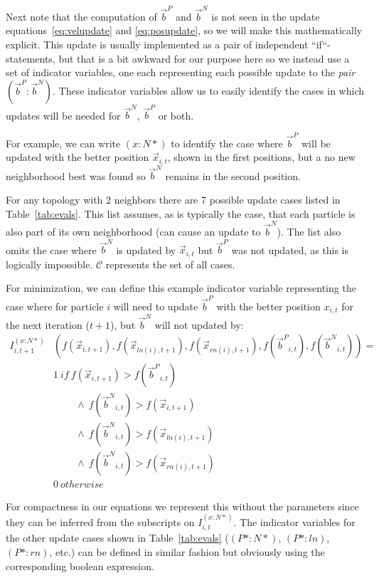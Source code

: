 \documentclass[journal,letterpaper]{IEEEtran}
\providecommand{\pers}{\ensuremath{P}}
\providecommand{\neigh}{\ensuremath{N}}
\providecommand{\ppos}{\ensuremath{\Vec{x}}}
\providecommand{\nbest}{\ensuremath{\Vec{b}^\neigh}}
\providecommand{\pbest}{\ensuremath{\Vec{b}^\pers}}
\providecommand{\ofunc}{\ensuremath{f}}
\providecommand{\indic}{\ensuremath{I}}
\providecommand{\ln}{\ensuremath{ln}}
\providecommand{\rn}{\ensuremath{rn}}
\providecommand{\caseset}{\ensuremath{\mathcal{C}}}
\providecommand{\casedef}{\ensuremath{(\pbest:\nbest)}}
\providecommand{\casexn}{\ensuremath{(x:\neigh*)}}
\providecommand{\casepn}{\ensuremath{(\pers*:\neigh*)}}
\providecommand{\casepl}{\ensuremath{(\pers*:\ln)}}
\providecommand{\casepr}{\ensuremath{(\pers*:\rn)}}
\begin{document}
Next note that the computation of $\pbest$ and $\nbest$ is not seen in the
update equations~\eqref{eq:velupdate} and \eqref{eq:posupdate}, so we will make
this mathematically explicit.  This update is usually implemented as a pair of
independent ``if``-statements, but that is a bit awkward for our purpose here
so we instead use a set of indicator variables, one each representing each
possible update to the \emph{pair} $\casedef$.  These indicator variables allow
us to easily identify the cases in which updates will be needed for $\nbest$,
$\pbest$ or both.

For example, we can write $\casexn$ to identify the case where $\pbest$ will be
updated with the better position $\ppos_{i,t}$, shown in the first positions,
but a no new neighborhood best was found so $\nbest$ remains in the second
position.

For any topology with 2 neighbors there are 7 possible update cases listed in
Table~\ref{tab:evals}.  This list assumes, as is typically the case, that each
particle is also part of its own neighborhood (can cause an update to
$\nbest$). The list also omits the case where $\nbest$ is updated by
$\ppos_{i,t}$ but $\pbest$ was not updated, as this is logically impossible.
$\caseset$ represents the set of all cases.

For minimization, we can define this example indicator variable representing the case
where for particle $i$ will need to update $\pbest$ with the better
position $x_{i,t}$ for the next iteration ($t+1$), but $\nbest$ will not updated by:
\begin{align}
\nonumber
	\indic_{i,t+1}^{\casexn} & (\ofunc ( \ppos_{i,t+1} ) ,\ofunc(\ppos_{\ln(i),t+1}),\ofunc(\ppos_{\rn(i),t+1}) ,\ofunc(\pbest_{i,t}) ,\ofunc(\nbest_{i,t}))= \\
\nonumber
	& 1 \ if \  \ofunc(\ppos_{i,t+1}) > \ofunc(\pbest_{i,t}) \\
\nonumber
	& \quad \quad \ \wedge \ \ofunc(\nbest_{i,t}) > \ofunc(\ppos_{i,t+1}) \\
\nonumber
	& \quad \quad \ \wedge \ \ofunc(\nbest_{i,t}) > \ofunc(\ppos_{\ln(i),t+1}) \\
\nonumber
	& \quad \quad \ \wedge \ \ofunc(\nbest_{i,t}) > \ofunc(\ppos_{\rn(i),t+1}) \\
\label{eq:deficasexn}
	& 0 \ otherwise
\end{align}

For compactness in our equations we represent this without the parameters since
they can be inferred from the subscripts on $\indic_{i,t}^{\casexn}$.  The
indicator variables for the other update cases shown in Table~\ref{tab:evals}
($\casepn$, $\casepl$, $\casepr$, etc.) can be defined in similar fashion but
obviously using the corresponding boolean expression.
\end{document}
